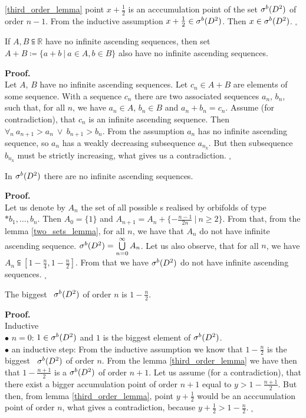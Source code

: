 \ref{third_order_lemma} point $x+\frac{1}{2}$ is an acccumulation point of the set ${\mathcal{\sigma}^b(D^2)}$  
of order $n-1$. From the inductive assumption $x+\frac{1}{2} \in {\mathcal{\sigma}^b(D^2)}$. Then $x \in {\mathcal{\sigma}^b(D^2)}$. 
$_\square$ 
\begin{lemma}\label{two_sets_lemma}
If $A, B \subseteqq \mathbb{R}$ have no infinite ascending sequences, then set 
$A + B \coloneqq \{a+b\ |\ a \in A, b \in B\}$ also have no infinite ascending sequences. 
\end{lemma}
\noindent\textbf{Proof.} \\
Let $A$, $B$ have no infinite ascending sequences. 
Let $c_n \in A + B$ are elements of some sequence. With a sequence $c_n$ there are 
two associated sequences $a_n$, $b_n$, such that, for all $n$, we have $a_n \in A$, $b_n \in B$ and 
$a_n + b_n = c_n$. Assume (for contradiction), that $c_n$ is an infinite ascending sequence. 
Then $\forall_n\ a_{n+1}>a_n\ \lor\ b_{n+1} > b_n$. From the assumption $a_n$ has no infinite 
ascending sequence, so $a_n$ has a weakly decreasing subsequence $a_{n_k}$. But then 
subsequence $b_{n_k}$ must be strictly increasing, what gives 
us a contradiction. \Lightning $_\square$ 
\begin{lemma}\label{well_order}
In ${\mathcal{\sigma}^b(D^2)}$ there are no infinite ascending sequences.
\end{lemma}
\noindent\textbf{Proof.} \\
Let us denote by $A_n$ the set of all possible \Eoc s realised by orbifolds of type 
$*b_1,\dots,b_n$. Then $A_0 = \{1\}$ and $A_{n+1}=A_n+\{-\frac{n-1}{2n}\ |\ n\geq 2\}$. 
From that, from the lemma \ref{two_sets_lemma}, for all $n$, we have that $A_n$ do not have 
infinite ascending sequence. ${\mathcal{\sigma}^b(D^2)} = \bigcup\limits^\infty_{n=0}A_n$. Let us also observe, that 
for all $n$, we have $A_n \subseteqq [1-\frac{n}{4},1-\frac{n}{2}]$. From that we have ${\mathcal{\sigma}^b(D^2)}$ 
do not have infinite ascending sequences. $_\square$
\begin{theorem}\label{biggest \apots}
The biggest \apots\ ${\mathcal{\sigma}^b(D^2)}$ of order $n$ is $1-\frac{n}{2}$.
\end{theorem}
\noindent\textbf{Proof.}\\
Inductive \\
$\bullet$ $n=0$: $1\in {\mathcal{\sigma}^b(D^2)}$ and $1$ is the biggest element of ${\mathcal{\sigma}^b(D^2)}$. \\
$\bullet$ an inductive step: From the inductive assumption we know that $1-\frac{n}{2}$ is 
the biggest \apots\  ${\mathcal{\sigma}^b(D^2)}$ of order $n$. From the lemma \ref{third_order_lemma} we have then 
that $1-\frac{n+1}{2}$ is a \apots  ${\mathcal{\sigma}^b(D^2)}$ of order $n+1$. Let us assume (for a contradiction), 
that there exist a bigger accumulation point of order $n+1$ equal to $y > 1-\frac{n+1}{2}$. 
But then, from lemma \ref{third_order_lemma}, point $y+\frac{1}{2}$ would be an acccumulation point 
of order $n$, what gives a contradiction, because $y+\frac{1}{2}>1-\frac{n}{2}$. $_\square$ 
